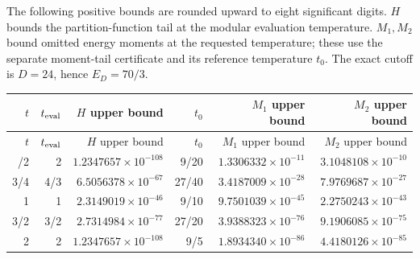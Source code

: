 \endgroup
The following positive bounds are rounded upward to eight significant
digits. $H$ bounds the partition-function tail at the modular evaluation
temperature. $M_1,M_2$ bound omitted energy moments at the requested
temperature; these use the separate moment-tail certificate and its
reference temperature $t_0$. The exact cutoff is $D=24$, hence
$E_D=70/3$.

\begingroup\scriptsize
\setlength{\tabcolsep}{5pt}
\begin{longtable}{@{}rrrrrr@{}}
\toprule
$t$ & $t_{\rm eval}$ & $H$ upper bound & $t_0$ & $M_1$ upper bound & $M_2$ upper bound\\
\midrule\endfirsthead
\toprule
$t$ & $t_{\rm eval}$ & $H$ upper bound & $t_0$ & $M_1$ upper bound & $M_2$ upper bound\\
\midrule\endhead
\bottomrule\endfoot
1/2 & 2 & $1.2347657\times10^{-108}$ & 9/20 & $1.3306332\times10^{-11}$ & $3.1048108\times10^{-10}$\\
3/4 & 4/3 & $6.5056378\times10^{-67}$ & 27/40 & $3.4187009\times10^{-28}$ & $7.9769687\times10^{-27}$\\
1 & 1 & $2.3149019\times10^{-46}$ & 9/10 & $9.7501039\times10^{-45}$ & $2.2750243\times10^{-43}$\\
3/2 & 3/2 & $2.7314984\times10^{-77}$ & 27/20 & $3.9388323\times10^{-76}$ & $9.1906085\times10^{-75}$\\
2 & 2 & $1.2347657\times10^{-108}$ & 9/5 & $1.8934340\times10^{-86}$ & $4.4180126\times10^{-85}$\\
\end{longtable}
\endgroup
